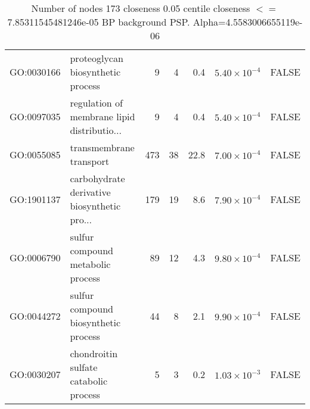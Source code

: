 \begin{table}[ht]
\begin{adjustbox}{max width=\textwidth}
\begin{tabular}{llrrrrl}
  GO:0030166 & proteoglycan biosynthetic process & 9 & 4 & 0.4 & $5.40 \times 10^{-4}$ & FALSE \\ 
  GO:0097035 & regulation of membrane lipid distributio... & 9 & 4 & 0.4 & $5.40 \times 10^{-4}$ & FALSE \\ 
  GO:0055085 & transmembrane transport & 473 & 38 & 22.8 & $7.00 \times 10^{-4}$ & FALSE \\ 
  GO:1901137 & carbohydrate derivative biosynthetic pro... & 179 & 19 & 8.6 & $7.90 \times 10^{-4}$ & FALSE \\ 
  GO:0006790 & sulfur compound metabolic process & 89 & 12 & 4.3 & $9.80 \times 10^{-4}$ & FALSE \\ 
  GO:0044272 & sulfur compound biosynthetic process & 44 & 8 & 2.1 & $9.90 \times 10^{-4}$ & FALSE \\ 
  GO:0030207 & chondroitin sulfate catabolic process & 5 & 3 & 0.2 & $1.03 \times 10^{-3}$ & FALSE \\ 
   \hline
\end{tabular}
\end{adjustbox}
\caption{Number of nodes 173 closeness 0.05 centile  closeness $<=$ 7.85311545481246e-05 BP background PSP. Alpha=4.5583006655119e-06} 
\label{tab:Number of nodes 173 closeness 0.05 centile  closeness $<=$ 7.85311545481246e-05 BP background PSP. Alpha=4.5583006655119e-06}
\end{table}



